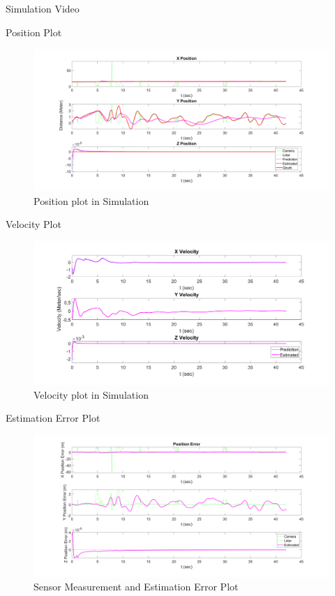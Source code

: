 \documentclass[10pt]{beamer}
\begin{document}
\begin{frame}{Simulation}
 \centering
 \huge
 Video    
\end{frame}

\begin{frame}{Position Plot}
\begin{figure}
    \centering
    \includegraphics[width=1\textwidth]{Images/Position_plot.png}
    \caption{Position plot in Simulation}
\end{figure}
\end{frame}

\begin{frame}{Velocity Plot}
\begin{figure}
    \centering
    \includegraphics[width=1\textwidth]{Images/Velocity_plot.png}
    \caption{Velocity plot in Simulation}
\end{figure}
\end{frame}

\begin{frame}{Estimation Error Plot}
\begin{figure}
    \centering
    \includegraphics[width=1\textwidth]{Images/Residue_error_plot.png}
    \caption{Sensor Measurement and Estimation Error Plot}
\end{figure}
\end{frame}
\end{document}
